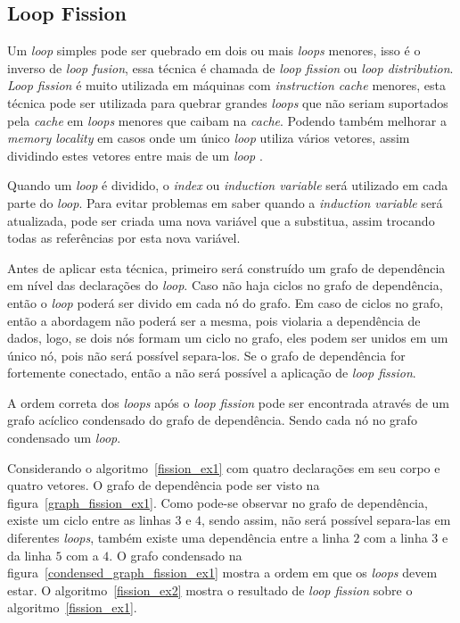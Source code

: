 
\subsection{Loop Fission}

Um \textit{loop} simples pode ser quebrado em dois ou mais \textit{loops}
menores, isso é o inverso de \textit{loop fusion}, essa técnica é chamada de
\textit{loop fission} ou \textit{loop distribution}.
\textit{Loop fission} é muito utilizada em máquinas com 
\textit{instruction cache} menores, esta técnica pode ser utilizada para quebrar
grandes \textit{loops} que não seriam suportados pela \textit{cache} em
\textit{loops} menores que caibam na \textit{cache}.
Podendo também melhorar a \textit{memory locality} em casos onde um único
\textit{loop} utiliza vários vetores, assim dividindo estes vetores entre mais 
de um \textit{loop} \cite{hpcfpc}.

Quando um \textit{loop} é dividido, o \textit{index} ou \textit{induction
variable} será utilizado em cada parte do \textit{loop}. 
Para evitar problemas em saber quando a \textit{induction variable} será
atualizada, pode ser criada uma nova variável que a substitua, assim trocando
todas as referências por esta nova variável.

Antes de aplicar esta técnica, primeiro será construído um grafo de dependência em
nível das declarações do \textit{loop}. 
Caso não haja ciclos no grafo de dependência, então o \textit{loop} poderá ser
divido em cada nó do grafo. 
Em caso de ciclos no grafo, então a abordagem não poderá ser a mesma, pois
violaria a dependência de dados, logo, se dois nós formam um ciclo no grafo,
eles podem ser unidos em um único nó, pois não será possível separa-los.
Se o grafo de dependência for fortemente conectado, então a não será possível a
aplicação de \textit{loop fission}.

A ordem correta dos \textit{loops} após o \textit{loop fission} pode ser
encontrada através de um grafo acíclico condensado do grafo de dependência.
Sendo cada nó no grafo condensado um \textit{loop}.

Considerando o algoritmo~\ref{fission_ex1} com quatro declarações em seu corpo e
quatro vetores. 
O grafo de dependência pode ser visto na figura~\ref{graph_fission_ex1}. 
Como pode-se observar no grafo de dependência, existe um ciclo entre as linhas
$3$ e $4$, sendo assim, não será possível separa-las em diferentes
\textit{loops}, também existe uma dependência entre a linha $2$ com a linha $3$
e da linha $5$ com a $4$.
O grafo condensado na figura~\ref{condensed_graph_fission_ex1} mostra a
ordem em que os \textit{loops} devem estar.
O algoritmo~\ref{fission_ex2} mostra o resultado de \textit{loop fission} sobre
o algoritmo~\ref{fission_ex1}.

